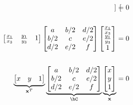 \begin{problem}
\begin{enumalph}
\begin{answer}
\begin{align*}
\begin{bmatrix}
          \end{bmatrix} &= 0 \\ \\
          \begin{bmatrix}
            \frac{x_1}{x_3} & \frac{y_1}{y_3} & 1 \\
          \end{bmatrix}
          \begin{bmatrix}
            a & b/2 & d/2 \\
            b/2 & c & e/2 \\
            d/2 & e/2 & f \\
          \end{bmatrix}
          \begin{bmatrix}
            \frac{x_1}{x_3} \\
            \frac{y_1}{y_3} \\
            1 \\
          \end{bmatrix}
          &= 0 \\ \\
          \underbrace{\begin{bmatrix}
            x & y & 1 \\
          \end{bmatrix}}_{\bx^T}
          \underbrace{\begin{bmatrix}
            a & b/2 & d/2 \\
            b/2 & c & e/2 \\
            d/2 & e/2 & f \\
          \end{bmatrix}}_{\bC}
          \underbrace{\begin{bmatrix}
            x \\
            y \\
            1 \\
          \end{bmatrix}}_{\bx}
          &= 0
        \end{align*}
      \end{answer}


\end{enumalph}
\end{problem}
